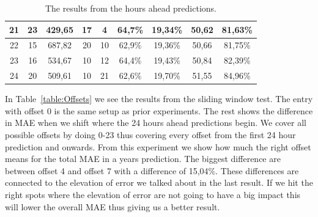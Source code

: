 \begin{table}[H]
{\begin{tabular}{|c|c|c|c|c|c|c|c|c|}
	21 & 23  & 429,65 & 17 & 4  & 64,7\% & 19,34\% & 50,62 & 81,63\% \\ \hline
	22 & 15  & 687,82 & 20 & 10 & 62,9\% & 19,36\% & 50,66 & 81,75\% \\ \hline
	23 & 16  & 534,67 & 10 & 12 & 64,4\% & 19,43\% & 50,84 & 82,39\% \\ \hline
	24 & 20  & 509,61 & 10 & 21 & 62,6\% & 19,70\% & 51,55 & 84,96\% \\ \hline
	\end{tabular}
}
\caption{The results from the hours ahead predictions.} %
\label{table:XHoursAhead} %
\end{table}

In Table~\ref{table:Offsets} we see the results from the sliding window test. The entry with offset 0 is the same setup as prior experiments. The rest shows the difference in MAE when we shift where the 24 hours ahead predictions begin. We cover all possible offsets by doing 0-23 thus covering every offset from the first 24 hour prediction and onwards. From this experiment we show how much the right offset means for the total MAE in a years prediction. The biggest difference are between offset 4 and offset 7 with a difference of 15,04\%. These differences are connected to the elevation of error we talked about in the last result. If we hit the right spots where the elevation of error are not going to have a big impact this will lower the overall MAE thus giving us a better result.

